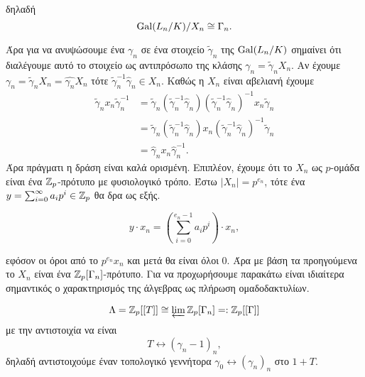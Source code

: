 \noindent δηλαδή
$$\operatorname{Gal}(L_n/K)/X_n \cong \Gamma_n .$$

\noindent Άρα για να ανυψώσουμε ένα $\gamma_n$ σε ένα στοιχείο $\tilde{\gamma}_n$ της $\operatorname{Gal}(L_n/K)$ σημαίνει ότι διαλέγουμε αυτό το στοιχείο ως αντιπρόσωπο της κλάσης $\gamma_n = \tilde{\gamma}_n X_n$. Αν έχουμε $\gamma_n = \tilde{\gamma}_n X_n = \hat{\gamma_n}X_n$ τότε $\tilde{\gamma}^{-1}_n \hat{\gamma}_n \in X_n$. Καθώς η $X_n$ είναι αβελιανή έχουμε 
\begin{align*}
    \tilde{\gamma}_n x_n \tilde{\gamma}_n^{-1} & = \tilde{\gamma}_n \left( \tilde{\gamma}_n^{-1} \hat{\gamma}_n\right) \left(\tilde{\gamma}_n^{-1} \hat{\gamma}_n\right)^{-1} x_n \tilde{\gamma}_n\\
    & = \tilde{\gamma}_n \left( \tilde{\gamma}_n^{-1} \hat{\gamma}_n\right) x_n \left(\tilde{\gamma}_n^{-1} \hat{\gamma}_n\right)^{-1} \tilde{\gamma}_n \\
    & = \hat{\gamma}_n x_n \hat{\gamma}_n^{-1}.
\end{align*} 
Άρα πράγματι η δράση είναι καλά ορισμένη. Επιπλέον, έχουμε ότι το $X_n$ ως $p$-ομάδα είναι ένα $\mathbb{Z}_p$-πρότυπο με φυσιολογικό τρόπο. Έστω $|X_n|=p^{e_n}$, τότε ένα $y = \sum_{i=0}^\infty a_i p^i \in \mathbb{Z}_p$ θα δρα ως εξής.

$$y \cdot x_n = \left(\sum\limits_{i=0}^{e_n-1} a_i p^i \right) \cdot x_n,$$




\noindent εφόσον οι όροι από το $p^{e_n} x_n$ και μετά θα είναι όλοι $0$. Άρα με βάση τα προηγούμενα το $X_n$ είναι ένα $\mathbb{Z}_p[\Gamma_n]$-πρότυπο. Για να προχωρήσουμε παρακάτω είναι ιδιαίτερα σημαντικός ο χαρακτηρισμός της άλγεβρας  ως πλήρωση ομαδοδακτυλίων.

\begin{theorem}
    $$\Lambda = \mathbb{Z}_p[[T]] \cong \varprojlim \mathbb{Z}_p[\Gamma_n] = : \mathbb{Z}_p [[\Gamma]]$$ με την αντιστοιχία να είναι
    $$ T \longleftrightarrow (\gamma_n -1 )_n,$$ δηλαδή αντιστοιχούμε έναν τοπολογικό γεννήτορα $\gamma_0 \longleftrightarrow (\gamma_n)_n$ στο $1+T$. 
\end{theorem}

